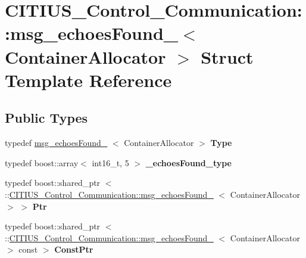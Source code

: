 \hypertarget{struct_c_i_t_i_u_s___control___communication_1_1msg__echoes_found__}{\section{\-C\-I\-T\-I\-U\-S\-\_\-\-Control\-\_\-\-Communication\-:\-:msg\-\_\-echoes\-Found\-\_\-$<$ \-Container\-Allocator $>$ \-Struct \-Template \-Reference}
\label{struct_c_i_t_i_u_s___control___communication_1_1msg__echoes_found__}
}
\subsection*{\-Public \-Types}
\begin{DoxyCompactItemize}
\item 
\hypertarget{struct_c_i_t_i_u_s___control___communication_1_1msg__echoes_found___aea13ff596832416bf39c99aebd639add}{typedef \hyperlink{struct_c_i_t_i_u_s___control___communication_1_1msg__echoes_found__}{msg\-\_\-echoes\-Found\-\_\-}\*
$<$ \-Container\-Allocator $>$ {\bfseries \-Type}}\label{struct_c_i_t_i_u_s___control___communication_1_1msg__echoes_found___aea13ff596832416bf39c99aebd639add}

\item 
\hypertarget{struct_c_i_t_i_u_s___control___communication_1_1msg__echoes_found___a95015a849170a2776dec026d0778147a}{typedef boost\-::array$<$ int16\-\_\-t, 5 $>$ {\bfseries \-\_\-echoes\-Found\-\_\-type}}\label{struct_c_i_t_i_u_s___control___communication_1_1msg__echoes_found___a95015a849170a2776dec026d0778147a}

\item 
\hypertarget{struct_c_i_t_i_u_s___control___communication_1_1msg__echoes_found___a3ad178fe2a05f622cba636ad11c510ba}{typedef boost\-::shared\-\_\-ptr\*
$<$ \-::\hyperlink{struct_c_i_t_i_u_s___control___communication_1_1msg__echoes_found__}{\-C\-I\-T\-I\-U\-S\-\_\-\-Control\-\_\-\-Communication\-::msg\-\_\-echoes\-Found\-\_\-}\*
$<$ \-Container\-Allocator $>$ $>$ {\bfseries \-Ptr}}\label{struct_c_i_t_i_u_s___control___communication_1_1msg__echoes_found___a3ad178fe2a05f622cba636ad11c510ba}

\item 
\hypertarget{struct_c_i_t_i_u_s___control___communication_1_1msg__echoes_found___a4b3e755bba0e39d9b6d9242ab52a6fc2}{typedef boost\-::shared\-\_\-ptr\*
$<$ \-::\hyperlink{struct_c_i_t_i_u_s___control___communication_1_1msg__echoes_found__}{\-C\-I\-T\-I\-U\-S\-\_\-\-Control\-\_\-\-Communication\-::msg\-\_\-echoes\-Found\-\_\-}\*
$<$ \-Container\-Allocator $>$ const  $>$ {\bfseries \-Const\-Ptr}}\label{struct_c_i_t_i_u_s___control___communication_1_1msg__echoes_found___a4b3e755bba0e39d9b6d9242ab52a6fc2}

\end{DoxyCompactItemize}
